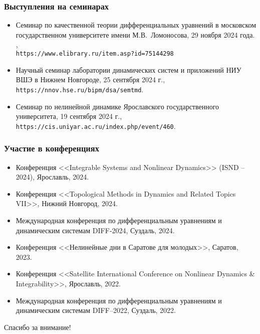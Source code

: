 \begin{frame}
    \frametitle{Выступления на семинарах}
    \begin{itemize}
        \item Семинар по качественной теории дифференциальных уравнений в московском государственном университете имени М.В.~Ломоносова, 29 ноября 2024 года. \cite{Sergeev2024},\\\texttt{https://www.elibrary.ru/item.asp?id=75144298}
        \item Научный семинар лаборатории динамических систем и приложений НИУ ВШЭ в Нижнем Новгороде, 25 сентября 2024 г.,\\\texttt{https://nnov.hse.ru/bipm/dsa/semtmd}.
        \item Семинар по нелинейной динамике Ярославского государственного университета, 19 сентября 2024 г.,\\\texttt{https://cis.uniyar.ac.ru/index.php/event/460}.
    \end{itemize}
\end{frame}

\begin{frame}
	\frametitle{Участие в конференциях}
	\begin{itemize}
		\item Конференция <<Integrable Systems and Nonlinear Dynamics>> (ISND – 2024), Ярославль, 2024.
		\item Конференция <<Topological Methods in Dynamics and Related Topics VII>>, Нижний Новгород, 2024.
		\item Международная конференция по дифференциальным уравнениям и динамическим системам DIFF-2024, Суздаль, 2024.
		\item Конференция <<Нелинейные дни в Саратове для молодых>>, Саратов, 2023.
		\item Конференция <<Satellite International Conference on Nonlinear Dynamics {\&} Integrability>>, Ярославль, 2022.
		\item Международная конференция по дифференциальным уравнениям и динамическим системам DIFF--2022, Суздаль, 2022.
	\end{itemize}
\end{frame}

\begin{frame} %
    \begin{center}
        \Huge
        Спасибо за внимание!
    \end{center}
\end{frame}
